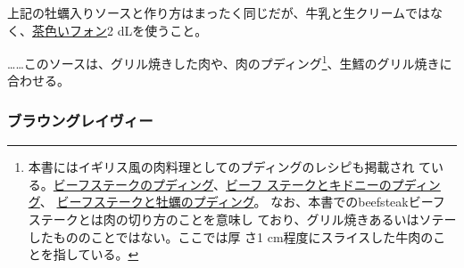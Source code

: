 \begin{recette}
上記の牡蠣入りソースと作り方はまったく同じだが、牛乳と生クリームではな
く、\protect\hyperlink{fonds-brun}{茶色いフォン}2 dLを使うこと。

\ldots{}\ldots{}このソースは、グリル焼きした肉や、肉のプディング\footnote{本書にはイギリス風の肉料理としてのプディングのレシピも掲載され
  ている。\protect\hyperlink{beefteak-pudding}{ビーフステークのプディング}、\protect\hyperlink{beefsteak-and-kidney-pudding}{ビーフ
  ステークとキドニーのプディング}、
  \protect\hyperlink{beefsteak-and-oysters-pudding}{ビーフステークと牡蠣のプディング}。
  なお、本書でのbeefsteakビーフステークとは肉の切り方のことを意味し
  ており、グリル焼きあるいはソテーしたもののことではない。ここでは厚 さ1
  cm程度にスライスした牛肉のことを指している。}、生鱈のグリル焼きに合わせる。

\maeaki

\hypertarget{brown-gravy}{%
\subsubsection{ブラウングレイヴィー}\label{brown-gravy}}




\end{recette}
